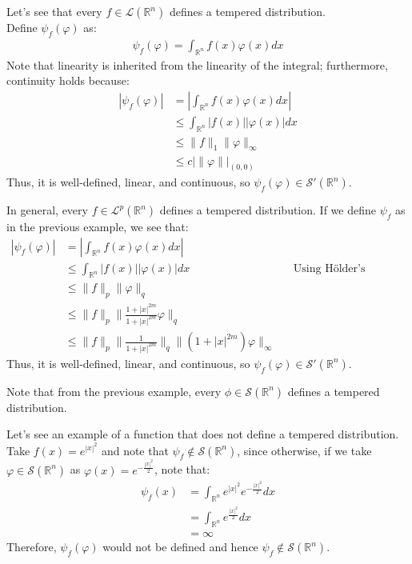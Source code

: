 \begin{example}{}
	Let's see that every $f\in\mathcal{L}(\mathbb{R}^n)$ defines a tempered distribution.\\
	Define $\psi_{f}(\varphi)$ as:
	\begin{align*}
		\psi_{f}(\varphi)=\int_{\mathbb{R}^n}f(x)\varphi(x)dx
	\end{align*}
	Note that linearity is inherited from the linearity of the integral; furthermore, continuity holds because:
	\begin{align*}
		|\psi_{f}(\varphi)|&=|\int_{\mathbb{R}^n}f(x)\varphi(x)dx|\\
		&\leq\int_{\mathbb{R}^n}|f(x)||\varphi(x)|dx\\
		&\leq\|f\|_{1} \|\varphi\|_{\infty}\\
		&\leq c|\|\varphi\||_{(0,0)}
	\end{align*}
	Thus, it is well-defined, linear, and continuous, so $\psi_{f}(\varphi)\in \mathcal{S}'(\mathbb{R}^n)$.
\end{example}
\begin{example}{}
	In general, every $f\in\mathcal{L}^p(\mathbb{R}^n)$ defines a tempered distribution. If we define $\psi_{f}$ as in the previous example, we see that:
	\begin{align*}
		|\psi_{f}(\varphi)|&=|\int_{\mathbb{R}^n}f(x)\varphi(x)dx|\\
		&\leq\int_{\mathbb{R}^n}|f(x)||\varphi(x)|dx &&\text{Using Hölder's inequality.}\\
		&\leq\|f\|_{p} \|\varphi\|_{q}\\
		&\leq\|f\|_{p} \|\frac{1+|x|^{2m}}{1+|x|^{2m}}\varphi\|_{q}\\
		&\leq\|f\|_{p} \|\frac{1}{1+|x|^{2m}}\|_{q}\|(1+|x|^{2m})\varphi\|_{\infty}
	\end{align*}
	Thus, it is well-defined, linear, and continuous, so $\psi_{f}(\varphi)\in \mathcal{S}'(\mathbb{R}^n)$.
\end{example}
\begin{example}{}
	Note that from the previous example, every $\phi\in\mathcal{S}(\mathbb{R}^n)$ defines a tempered distribution.
\end{example}
\begin{example}{}
  Let’s see an example of a function that does not define a tempered distribution.\\
  Take $f(x)=e^{|x|^2}$ and note that $\psi_f\notin\mathcal{S}(\mathbb{R}^n)$, since otherwise, if we take $\varphi\in\mathcal{S}(\mathbb{R}^n)$ as $\varphi(x)=e^{-\frac{|x|^2}{2}}$, note that:
  \begin{align*}
    \psi_{f}(x)&=\int_{\mathbb{R}^n}e^{|x|^2}e^{-\frac{|x|^2}{2}}dx\\
    &=\int_{\mathbb{R}^n}e^{\frac{|x|^2}{2}}dx\\
    &=\infty
  \end{align*}
  Therefore, $\psi_{f}(\varphi)$ would not be defined and hence $\psi_{f}\notin\mathcal{S}(\mathbb{R}^n)$.
\end{example}
